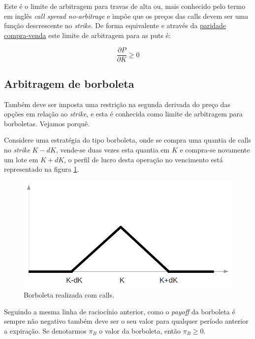 \documentclass[]{book}
\theoremstyle{definition}
\theoremstyle{definition}
\theoremstyle{definition}
\theoremstyle{remark}
\begin{document}
Este é o limite de arbitragem para travas de alta ou, mais conhecido pelo termo em inglês \emph{call spread no-arbitrage} e impõe que os preços das calls devem ser uma função descrescente no \emph{strike}. De forma equivalente e através da \protect\hyperlink{putcalparity}{paridade compra-venda} este limite de arbitragem para as puts é:

\begin{equation}
\frac{\partial P}{\partial K}\geq 0
\end{equation}

\hypertarget{arbitragem-de-borboleta}{%
\subsection{Arbitragem de borboleta}\label{arbitragem-de-borboleta}}

Também deve ser imposta uma restrição na segunda derivada do preço das opções em relação ao \emph{strike}, e esta é conhecida como limite de arbitragem para borboletas. Vejamos porquê.

Considere uma estratégia do tipo borboleta, onde se compra uma quantia de calls no \emph{strike} \(K-dK\), vende-se duas vezes esta quantia em \(K\) e compra-se novamente um lote em \(K+dK\), o perfil de lucro desta operação no vencimento está representado na figura \ref{fig:borboleta}.

\begin{figure}
\centering
\includegraphics{./images/borboleta.png}
\caption{\label{fig:borboleta}Borboleta realizada com calls.}
\end{figure}

Seguindo a mesma linha de raciocínio anterior, como o \emph{payoff} da borboleta é sempre não negativo também deve ser o seu valor para qualquer período anterior a expiração. Se denotarmos \(\pi_B\) o valor da borboleta, então \(\pi_B\geq0\).
\end{document}
